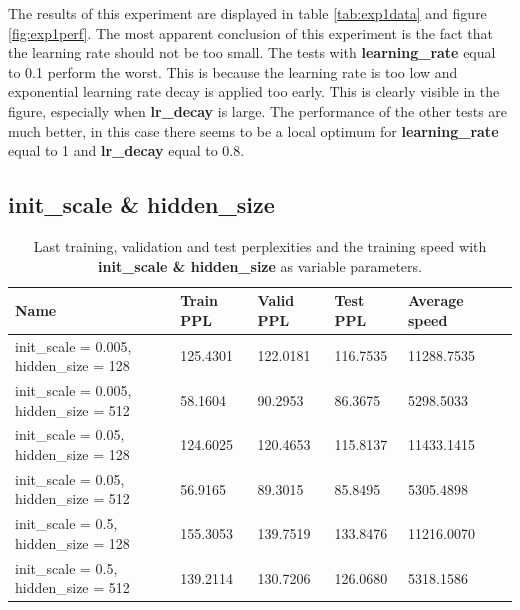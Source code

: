 \documentclass[10pt,a4paper,titlepage]{article}
\begin{document}
The results of this experiment are displayed in table \ref{tab:exp1data} and figure \ref{fig:exp1perf}. The most apparent conclusion of this experiment is the fact that the learning rate should not be too small. The tests with \textbf{learning\_rate} equal to 0.1 perform the worst. This is because the learning rate is too low and exponential learning rate decay is applied too early. This is clearly visible in the figure, especially when \textbf{lr\_decay} is large. The performance of the other tests are much better, in this case there seems to be a local optimum for \textbf{learning\_rate} equal to 1 and \textbf{lr\_decay} equal to 0.8.

\newpage

\subsection{init\_scale \& hidden\_size}

\begin{table}[H]
\centering
\caption{Last training, validation and test perplexities and the training speed with \textbf{init\_scale \& hidden\_size} as variable parameters.}
\label{tab:exp2data}
\begin{tabular}{|l|l|l|l|l|l|}
\hline
{\small Name} & {\small Train PPL} & {\small Valid PPL} & {\small Test PPL} & {\small Average speed}\\ \hline
{\small init\_scale = 0.005, hidden\_size = 128}         & 125.4301   & 122.0181   & 116.7535   & 11288.7535 \\ \hline
{\small init\_scale = 0.005, hidden\_size = 512}         & 58.1604    & 90.2953    & 86.3675    & 5298.5033  \\ \hline
{\small init\_scale = 0.05, hidden\_size = 128}          & 124.6025   & 120.4653   & 115.8137   & 11433.1415 \\ \hline
{\small init\_scale = 0.05, hidden\_size = 512}          & 56.9165    & 89.3015    & 85.8495    & 5305.4898  \\ \hline
{\small init\_scale = 0.5, hidden\_size = 128}           & 155.3053   & 139.7519   & 133.8476   & 11216.0070 \\ \hline
{\small init\_scale = 0.5, hidden\_size = 512}           & 139.2114   & 130.7206   & 126.0680   & 5318.1586  \\ \hline
\end{tabular}
\end{table}
\end{document}
